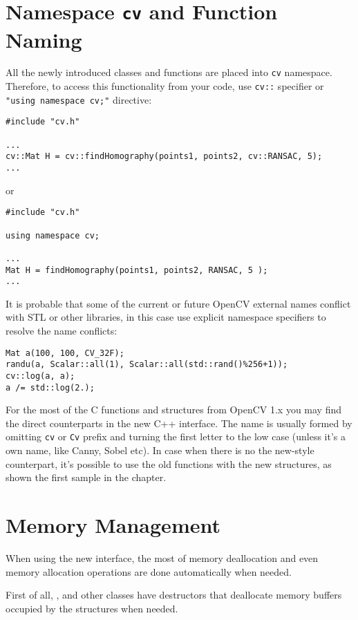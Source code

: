 \section{Namespace \texttt{cv} and Function Naming}

All the newly introduced classes and functions are placed into \texttt{cv} namespace. Therefore, to access this functionality from your code, use \texttt{cv::} specifier or \texttt{"using namespace cv;"} directive:
\begin{lstlisting}
#include "cv.h"

...
cv::Mat H = cv::findHomography(points1, points2, cv::RANSAC, 5);
...
\end{lstlisting}
or
\begin{lstlisting}
#include "cv.h"

using namespace cv;

...
Mat H = findHomography(points1, points2, RANSAC, 5 );
...
\end{lstlisting}

It is probable that some of the current or future OpenCV external names conflict with STL
or other libraries, in this case use explicit namespace specifiers to resolve the name conflicts:
\begin{lstlisting}
Mat a(100, 100, CV_32F);
randu(a, Scalar::all(1), Scalar::all(std::rand()%256+1));
cv::log(a, a);
a /= std::log(2.);
\end{lstlisting}

For the most of the C functions and structures from OpenCV 1.x you may find the direct counterparts in the new C++ interface. The name is usually formed by omitting \texttt{cv} or \texttt{Cv} prefix and turning the first letter to the low case (unless it's a own name, like Canny, Sobel etc). In case when there is no the new-style counterpart, it's possible to use the old functions with the new structures, as shown the first sample in the chapter.

\section{Memory Management}

When using the new interface, the most of memory deallocation and even memory allocation operations are done automatically when needed.

First of all, ,  and other classes have destructors
that deallocate memory buffers occupied by the structures when needed.

